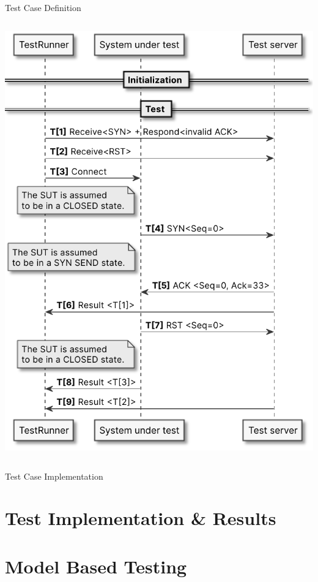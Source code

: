 \documentclass[showdate=true, slidenumbers=slide]{beamerruhuisstijl169}
\begin{document}
\begin{frame}{Test Case Definition}
\begin{columns}[T,totalwidth=\linewidth]
\begin{column}{0.4\textwidth}
            \includegraphics[height=0.75\textheight]{figures/testcases/TestCase3.pdf}
        \end{column}
    \end{columns}
\end{frame}

\begin{frame}{Test Case Implementation}
    
\end{frame}

\section{Test Implementation \& Results}

\section{Model Based Testing}
\end{document}
